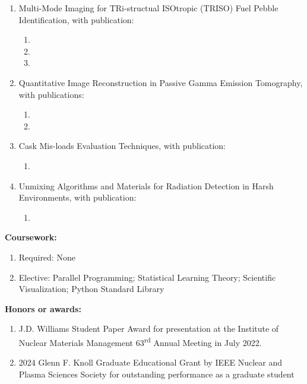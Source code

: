 \documentclass[letterpaper,11pt]{article} %
\newcommand{\CVItem}[1]{
  \item\small{
    {#1 \vspace{-2pt}}
  }
}
\begin{document}
        \begin{enumerate}[leftmargin=0.5cm, nolistsep]
            \item Multi-Mode Imaging for TRi-structual ISOtropic (TRISO) Fuel Pebble Identification, with publication:
            \begin{enumerate}[leftmargin=1.0cm, nolistsep, label=(\roman*)]
            \item {}
            \item {}
            \item {}
            \end{enumerate}
            \item Quantitative Image Reconstruction in Passive Gamma Emission Tomography, with publications:
            \begin{enumerate}[leftmargin=1.0cm, nolistsep, label=(\roman*)]
            \item {}
            \item {}
            \end{enumerate}
            \item Cask Mis-loads Evaluation Techniques, with publication:
            \begin{enumerate}[leftmargin=1.0cm, nolistsep, label=(\roman*)]
            \item {}
            \end{enumerate}
            \item Unmixing Algorithms and Materials for Radiation Detection in Harsh Environments, with publication:
            \begin{enumerate}[leftmargin=1.0cm, nolistsep, label=(\roman*)]
            \item {}
            \end{enumerate}
        \end{enumerate}
        \CVItem{\textbf{Coursework:}}
        \begin{enumerate}[leftmargin=0.5cm, nolistsep]
            \item Required: None
            \item Elective: Parallel Programming; Statistical Learning Theory; Scientific Visualization; Python Standard Library
        \end{enumerate}
        \CVItem{\textbf{Honors or awards:}}
        \begin{enumerate}[leftmargin=1.0cm, nolistsep, label=(\roman*)]
            \item J.D. Williams Student Paper Award for presentation at the Institute of Nuclear Materials Management 63\textsuperscript{rd} Annual Meeting in July 2022.
            \item 2024 Glenn F. Knoll Graduate Educational Grant by IEEE Nuclear and Plasma Sciences Society for outstanding performance as a graduate student
        \end{enumerate}
\end{document}
